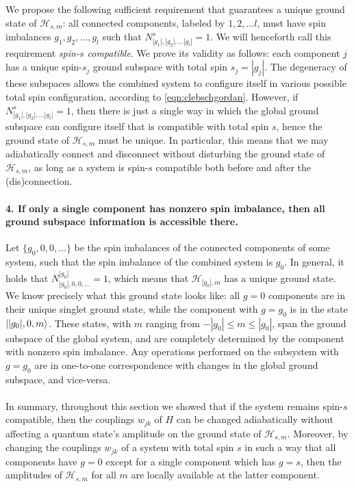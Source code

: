 We propose the following sufficient requirement that guarantees a unique ground state of $\mathcal{H}_{s,m}$: all connected components, labeled by $1, 2, \ldots l$, must have spin imbalances $g_1, g_2, \ldots, g_l$ such that $N_{|g_1|, |g_2|, \ldots |g_l|}^s = 1$. We will henceforth call this requirement \emph{spin-$s$ compatible}. We prove its validity as follows: each component $j$ has a unique spin-$s_j$ ground subspace with total spin $s_j = |g_j|$. The degeneracy of these subspaces allows the combined system to configure itself in various possible total spin configuration, according to \cref{eqn:clebschgordan}. However, if $N_{|g_1|, |g_2|, \ldots |g_l|}^s = 1$, then there is just a single way in which the global ground subspace can configure itself that is compatible with total spin $s$, hence the ground state of $\mathcal{H}_{s,m}$ must be unique. In particular, this means that we may adiabatically connect and disconnect without disturbing the ground state of $\mathcal{H}_{s,m}$, as long as a system is spin-$s$ compatible both before and after the (dis)connection. 

\paragraph{4. If only a single component has nonzero spin imbalance, then all ground subspace information is accessible there.} Let $\{ g_0, 0, 0, \ldots \}$ be the spin imbalances of the connected components of some system, such that the spin imbalance of the combined system is $g_0$. In general, it holds that $N_{|g_0|,0,0,\ldots}^{|g_0|} = 1$, which means that $\mathcal{H}_{|g_0|,m}$ has a unique ground state. We know precisely what this ground state looks like: all $g=0$ components are in their unique singlet ground state, while the component with $g=g_0$ is in the state $\lvert|g_0|,0,m\rangle$. These states, with $m$ ranging from $-|g_0| \leq m \leq |g_0|$, span the ground subspace of the global system, and are completely determined by the component with nonzero spin imbalance. Any operations performed on the subsystem with $g=g_0$ are in one-to-one correspondence with changes in the global ground subspace, and vice-versa. 

\paragraph{}
In summary, throughout this section we showed that if the system remains spin-$s$ compatible, then the couplings $w_{jk}$ of $H$ can be changed adiabatically without affecting a quantum state's amplitude on the ground state of $\mathcal{H}_{s,m}$. Moreover, by changing the couplings $w_{jk}$ of a system with total spin $s$ in such a way that all components have $g=0$ except for a single component which has $g=s$, then the amplitudes of $\mathcal{H}_{s,m}$ for all $m$ are locally available at the latter component. 








